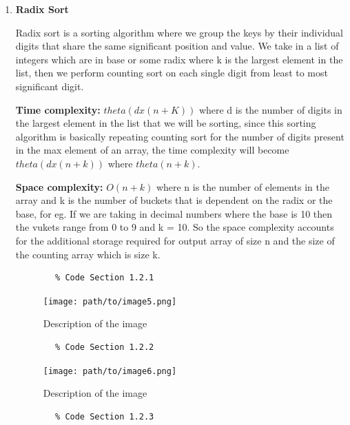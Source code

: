 \documentclass{article}
\begin{document}
\begin{enumerate}
\begin{enumerate}[label*=\arabic*.]
      \item \textbf{Radix Sort}

        Radix sort is a sorting algorithm where we group the keys by their individual digits that share the same significant position and value. We take in a list of integers which are in base or some radix where k is the largest element in the list, then we perform counting sort on each single digit from least to most significant digit. 

        \textbf{Time complexity:} \( theta(d x (n + K)) \) where d is the number of digits in the largest element in the list that we will be sorting, since this sorting algorithm is basically repeating counting sort for the number of digits present in the max element of an array, the time complexity will become \( theta (d x (n+k )) \) where \( theta(n + k) \). 

        \textbf{Space complexity:} \( O(n + k) \) where n is the number of elements in the array and k is the  number of buckets that is dependent on the radix or the base, for eg. If we are taking in decimal numbers where the base is 10 then the vukets range from 0 to 9 and k = 10. So the space complexity accounts for the additional storage required for output array of size n and the size of the counting array which is size k.

        \begin{verbatim}
        % Code Section 1.2.1
        \end{verbatim}

        \begin{figure}[h]
            \centering
            \texttt{[image: path/to/image5.png]}
            \caption{Description of the image}
            \label{fig:image5}
        \end{figure}

        \begin{verbatim}
        % Code Section 1.2.2
        \end{verbatim}

        \begin{figure}[h]
            \centering
            \texttt{[image: path/to/image6.png]}
            \caption{Description of the image}
            \label{fig:image6}
        \end{figure}

        \begin{verbatim}
        % Code Section 1.2.3
        \end{verbatim}


\end{enumerate}
\end{enumerate}
\end{document}

